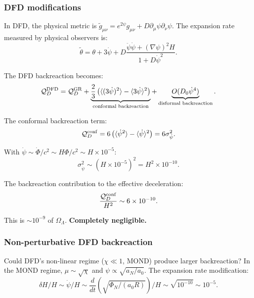 \documentclass[11pt,a4paper]{article}
\begin{document}
\subsubsection{DFD modifications}

In DFD, the physical metric is $\tilde{g}_{\mu\nu} = e^{2\psi}g_{\mu\nu} + D\partial_\mu\psi\partial_\nu\psi$. The expansion rate measured by physical observers is:
\begin{equation}
\tilde{\theta} = \theta + 3\dot\psi + D\frac{\ddot\psi\dot\psi + (\nabla\psi)^2 H}{1 + D\dot\psi^2}.
\end{equation}

The DFD backreaction becomes:
\begin{equation}
\mathcal{Q}_D^{\rm DFD} = \mathcal{Q}_D^{\rm GR} + \underbrace{\frac{2}{3}\left(\langle(3\dot\psi)^2\rangle - \langle 3\dot\psi\rangle^2\right)}_{\text{conformal backreaction}} + \underbrace{O(D_0\dot\psi^4)}_{\text{disformal backreaction}}.
\end{equation}

The conformal backreaction term:
\begin{equation}
\mathcal{Q}_D^{\rm conf} = 6\left(\langle\dot\psi^2\rangle - \langle\dot\psi\rangle^2\right) = 6\sigma_{\dot\psi}^2.
\end{equation}

With $\dot\psi \sim \dot\Phi/c^2 \sim H\Phi/c^2 \sim H \times 10^{-5}$:
\begin{equation}
\sigma_{\dot\psi}^2 \sim (H \times 10^{-5})^2 = H^2 \times 10^{-10}.
\end{equation}

The backreaction contribution to the effective deceleration:
\begin{equation}
\frac{\mathcal{Q}_D^{\rm conf}}{H^2} \sim 6 \times 10^{-10}.
\end{equation}

This is $\sim 10^{-9}$ of $\Omega_\Lambda$. \textbf{Completely negligible.}

\subsubsection{Non-perturbative DFD backreaction}

Could DFD's non-linear regime ($\chi \ll 1$, MOND) produce larger backreaction? In the MOND regime, $\mu \sim \sqrt{\chi}$ and $\psi \propto \sqrt{a_N/a_0}$. The expansion rate modification:
\begin{equation}
\delta H/H \sim \dot\psi/H \sim \frac{d}{dt}\left(\sqrt{\Phi_N/(a_0 R)}\right)/H \sim \sqrt{10^{-10}} \sim 10^{-5}.
\end{equation}
\end{document}
